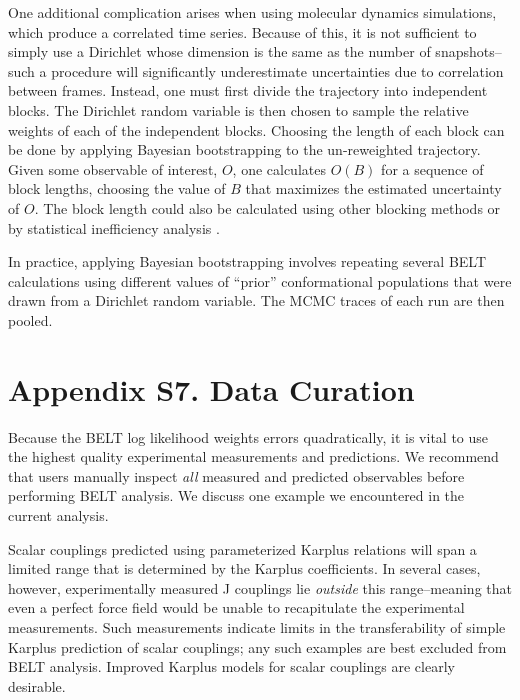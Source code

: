 \documentclass[12pt]{article}
\begin{document}
One additional complication arises when using molecular dynamics simulations, which produce a correlated time series.  Because of this, it is not sufficient to simply use a Dirichlet whose dimension is the same as the number of snapshots--such a procedure will significantly underestimate uncertainties due to correlation between frames.  Instead, one must first divide the trajectory into independent blocks.  The Dirichlet random variable is then chosen to sample the relative weights of each of the independent blocks.  Choosing the length of each block can be done by applying Bayesian bootstrapping to the un-reweighted trajectory.  Given some observable of interest, $O$, one calculates $O(B)$ for a sequence of block lengths, choosing the value of $B$ that maximizes the estimated uncertainty of $O$.  The block length could also be calculated using other blocking methods \cite{flyvbjerg1989error} or by statistical inefficiency analysis \cite{shirts2008}.  

In practice, applying Bayesian bootstrapping involves repeating several BELT calculations using different values of ``prior'' conformational populations that were drawn from a Dirichlet random variable.  The MCMC traces of each run are then pooled.  

\newpage

\section*{Appendix S7. Data Curation}

Because the BELT log likelihood weights errors quadratically, it is vital to use the highest quality experimental measurements and predictions.  We recommend that users manually inspect \emph{all} measured and predicted observables before performing BELT analysis.  We discuss one example we encountered in the current analysis.  

Scalar couplings predicted using parameterized Karplus relations will span a limited range that is determined by the Karplus coefficients.  In several cases, however, experimentally measured J couplings lie \emph{outside} this range--meaning that even a perfect force field would be unable to recapitulate the experimental measurements.  Such measurements indicate limits in the transferability of simple Karplus prediction of scalar couplings; any such examples are best excluded from BELT analysis.  Improved  Karplus models for scalar couplings are clearly desirable.  

\newpage
\end{document}
